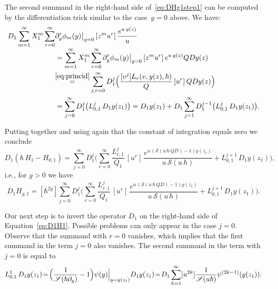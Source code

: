 \documentclass[11pt]{article}
\newcommand{\ie}{i.e.,\xspace}
\let\mathcal\mathscr
\theoremstyle{plain}
\theoremstyle{definition}
\theoremstyle{remark}
\newcommand{\cS}{\mathcal{S}}
\begin{document}
The second summand in the right-hand side of~\eqref{eq:DHg1step1} can be computed by the differentiation trick similar to the case~$g=0$ above. We have:\vspace*{-3pt}
\begin{align*}
D_1\sum_{m=1}^\infty X_1^m\sum_{r=0}^\infty&
\partial_y^r\phi_m(y)\big|_{y=0}\,[z^{m}u^r]\,
\frac{e^{u\,y(z)}}{u}\\[-3pt]
&=\sum_{m=1}^\infty X_1^m\sum_{r=0}^\infty
\partial_y^r\phi_m(y)\big|_{y=0}\,[z^{m}u^r]\,
e^{u\,y(z)}QDy(z)
\\&\!\mathop{=}^{\eqref{eq:princid}}
\sum_{j,r=0}^\infty D_1^j \Bigl(\frac{[v^j]L_r(v,y(z),\hbar)}{Q}\,[u^r]\, QDy(z) \Bigr)
\\&=\sum_{j=0}^\infty D_1^j\bigl(L_{0,1}^j\,D_1y(z_1)\bigr)
=D_1y(z_1)+D_1\sum_{j=1}^\infty D_1^{j-1}\bigl(L_{0,1}^j\, D_1y(z_1)\bigr).
\end{align*}

Putting together and using again that the constant of integration equals zero we conclude\vspace*{-5pt}
\begin{equation*}\label{eq:D1H1}
D_1(\hbar\,H_{1}-H_{0,1})=
\sum_{j=0}^\infty D_1^j\biggl(\sum_{r=0}^\infty\frac{L_{r,1}^j}{Q_1}
\,[u^r]\, \frac{e^{u\,(\cS(u\,\hbar\,Q D)-1)y(z_1)}}{u\,\cS(u\,\hbar)}+L_{0,1}^{j+1}\, D_1y(z_1) \biggr),
\end{equation*}
\ie for $g>0$ we have\vspace*{-5pt}
\begin{equation*}
D_1 H_{g,1}=[\hbar^{2g}]
\sum_{j=0}^\infty D_1^j \biggl(\sum_{r=0}^\infty\frac{L_{r,1}^j}{Q_1}
\,[u^r]\, \frac{e^{u\,(\cS(u\,\hbar\,Q D)-1)y(z_1)}}{u\,\cS(u\,\hbar)}+L_{0,1}^{j+1}\, D_1y(z_1) \biggr).
\end{equation*}

Our next step is to invert the operator $D_1$ on the right-hand side of Equation~\ref{eq:D1H1}. Possible problems can only appear in the case $j=0$. Observe that the summand with $r=0$ vanishes, which implies that the first summand in the term $j=0$ also vanishes. The second summand in the term with $j=0$ is equal to\vspace*{-5pt}
\[
L_{0,1}^1\,D_1 y(z_1)
\!=\!\Bigl(\frac1{\cS(\hbar \partial_y)}-1\Bigr)\psi(y)\Big|_{y=y(z_1)}D_1 y(z_1)
\!=\!D_1\sum_{k=1}^\infty[u^{2k}]\frac1{\cS(u \hbar)}\psi^{(2k-1)}(y(z_1)).
\]
\end{document}
